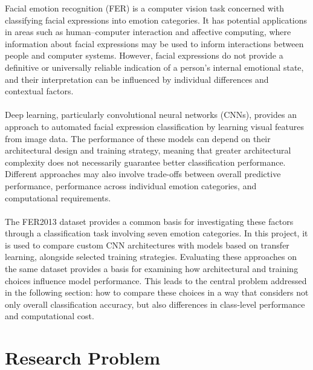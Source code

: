 \documentclass[12pt, a4paper]{report}
\let\oldsection\section
\renewcommand{\section}{%
    \Needspace{6\baselineskip}%
    \oldsection
}
\begin{document}
			Facial emotion recognition (FER) is a computer vision task concerned with classifying facial expressions into emotion categories. It has potential applications in areas such as human--computer interaction and affective computing, where information about facial expressions may be used to inform interactions between people and computer systems. However, facial expressions do not provide a definitive or universally reliable indication of a person's internal emotional state, and their interpretation can be influenced by individual differences and contextual factors.\\\\
			Deep learning, particularly convolutional neural networks (CNNs), provides an approach to automated facial expression classification by learning visual features from image data. The performance of these models can depend on their architectural design and training strategy, meaning that greater architectural complexity does not necessarily guarantee better classification performance. Different approaches may also involve trade-offs between overall predictive performance, performance across individual emotion categories, and computational requirements.\\\\
			The FER2013 dataset provides a common basis for investigating these factors through a classification task involving seven emotion categories. In this project, it is used to compare custom CNN architectures with models based on transfer learning, alongside selected training strategies. Evaluating these approaches on the same dataset provides a basis for examining how architectural and training choices influence model performance. This leads to the central problem addressed in the following section: how to compare these choices in a way that considers not only overall classification accuracy, but also differences in class-level performance and computational cost.
			
		\newpage
		\section{Research Problem}
			
\end{document}
